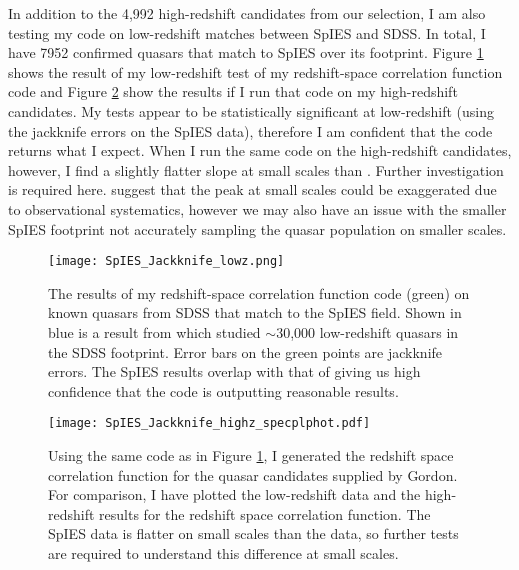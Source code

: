\documentclass[onecolumn]{emulateapj}
\begin{document}
In addition to the 4,992 high-redshift candidates from our selection, I am also testing my code on low-redshift matches between SpIES and SDSS. In total, I have 7952 confirmed quasars that match to SpIES over its footprint. Figure \ref{test_redshfit_corr} shows the result of my low-redshift test of my redshift-space correlation function code and Figure \ref{highz_redshfit_corr} show the results if I run that code on my high-redshift candidates. My tests appear to be statistically significant at low-redshift (using the jackknife errors on the SpIES data), therefore I am confident that the code returns what I expect. When I run the same code on the high-redshift candidates, however, I find a slightly flatter slope at small scales than \citet{Shen2007}. Further investigation is required here. \citet{Eftekharzadeh2015} suggest that the \citet{Shen2007} peak at small scales could be exaggerated due to observational systematics, however we may also have an issue with the smaller SpIES footprint not accurately sampling the quasar population on smaller scales.

\begin{figure}[!h]
	\centering
	\texttt{[image: SpIES\_Jackknife\_lowz.png]}
	\caption{\footnotesize{The results of my redshift-space correlation function code (green) on known quasars from SDSS that match to the SpIES field. Shown in blue is a result from \citep{Ross2009} which studied $\sim$30,000 low-redshift quasars in the SDSS footprint. Error bars on the green points are jackknife errors. The SpIES results overlap with that of \citet{Ross2009} giving us high confidence that the code is outputting reasonable results.}}
	\label{test_redshfit_corr}
\end{figure}

\begin{figure}[!h]
	\centering
	\texttt{[image: SpIES\_Jackknife\_highz\_specplphot.pdf]}
	\caption{\footnotesize{Using the same code as in Figure \ref{test_redshfit_corr}, I generated the redshift space correlation function for the quasar candidates supplied by Gordon. For comparison, I have plotted the \citet{Ross2009} low-redshift data and the \citep{Shen2007} high-redshift results for the redshift space correlation function. The SpIES data is flatter on small scales than the \citet{Shen2007} data, so further tests are required to understand this difference at small scales.}}
	\label{highz_redshfit_corr}
\end{figure}
\end{document}
